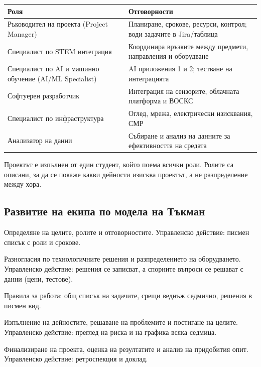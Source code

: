 \documentclass[11pt,a4paper]{article}
\begin{document}
\begin{tabularx}{\textwidth}{@{}>{\raggedright\arraybackslash}p{5cm}X@{}}
\toprule
Роля & Отговорности \\
\midrule
Ръководител на проекта (Project Manager) & Планиране, срокове, ресурси, контрол; води задачите в Jira/таблица \\
Специалист по STEM интеграция & Координира връзките между предмети, направления и оборудване \\
Специалист по AI и машинно обучение (AI/ML Specialist) & AI приложения 1 и 2; тестване на интеграцията \\
Софтуерен разработчик & Интеграция на сензорите, облачната платформа и ВОСКС \\
Специалист по инфраструктура & Оглед, мрежа, електрически изисквания, СМР \\
Анализатор на данни & Събиране и анализ на данните за ефективността на средата \\
\bottomrule
\end{tabularx}

Проектът е изпълнен от един студент, който поема всички роли. Ролите са описани, за да се покаже какви дейности изисква проектът, а не разпределение между хора.

\subsection{Развитие на екипа по модела на Тъкман}

\begin{description}[leftmargin=3cm, style=nextline]
  \item[Forming] Определяне на целите, ролите и отговорностите. Управленско действие: писмен списък с роли и срокове.
  \item[Storming] Разногласия по технологичните решения и разпределението на оборудването. Управленско действие: решения се записват, а спорните въпроси се решават с данни (цени, тестове).
  \item[Norming] Правила за работа: общ списък на задачите, срещи веднъж седмично, решения в писмен вид.
  \item[Performing] Изпълнение на дейностите, решаване на проблемите и постигане на целите. Управленско действие: преглед на риска и на графика всяка седмица.
  \item[Adjourning] Финализиране на проекта, оценка на резултатите и анализ на придобития опит. Управленско действие: ретроспекция и доклад.
\end{description}
\end{document}
